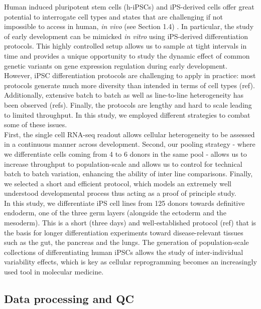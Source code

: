 Human induced pluripotent stem cells (h-iPSCs) and iPS-derived cells offer great potential to interrogate cell types and states that are challenging if not impossible to access in human, \textit{in vivo} (see Section 1.4) \cite{kilpinen2017common}.
In particular, the study of early development can be mimicked \textit{in vitro} using iPS-derived differentiation protocols. 
This highly controlled setup allows us to sample at tight intervals in time and provides a unique opportunity to study the dynamic effect of common genetic variants on gene expression regulation during early development.
However, iPSC differentiation protocols are challenging to apply in practice: most protocols generate much more diversity than intended in terms of cell types (ref). 
Additionally, extensive batch to batch as well as line-to-line heterogeneity has been observed (refs). 
Finally, the protocols are lengthy and hard to scale leading to limited throughput. 
In this study, we employed different strategies to combat some of these issues.\\ 

First, the single cell RNA-seq readout allows cellular heterogeneity to be assessed in a continuous manner across development.
Second, our pooling strategy - where we differentiate cells coming from 4 to 6 donors in the same pool - allows us to increase throughput to population-scale and allows us to control for technical batch to batch variation, enhancing the ability of inter line comparisons.
Finally, we selected a short and efficient protocol, which models an extremely well understood developmental process thus acting as a proof of principle study.\\

In this study, we differentiate iPS cell lines from 125 donors towards definitive endoderm, one of the three germ layers (alongside the ectoderm and the mesoderm). 
This is a short (three days) and well-established protocol (ref) that is the basis for longer differentiation experiments toward disease-relevant tissues such as the gut, the pancreas and the lungs.
The generation of population-scale collections of differentiating human iPSCs allows the study of inter-individual variability effects, which is key as cellular reprogramming becomes an increasingly used tool in molecular medicine.

\subsection{Data processing and QC}

